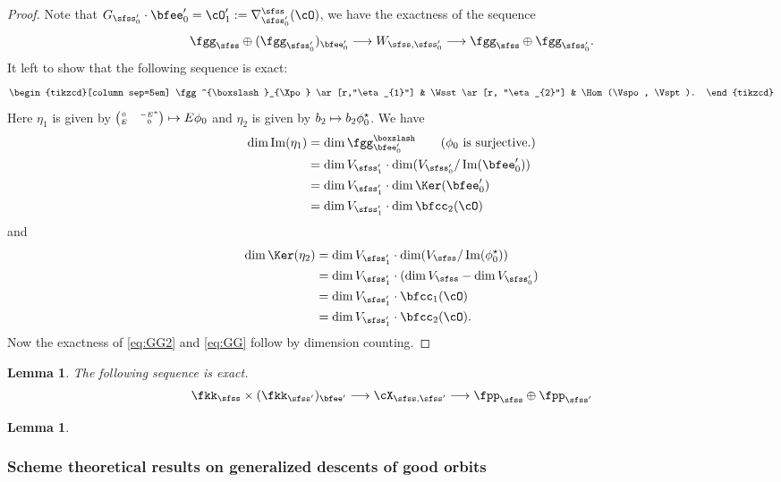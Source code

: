 \documentclass[12pt,a4paper]{amsart}
\def\Im{\operatorname{Im}}
\numberwithin{equation}{section}
\newtheorem{lem}[thm]{Lemma}
\theoremstyle{remark}
\def\mstar{{\star}}
\def\cOp{\cO^{\prime}}
\begin{document}
\begin{proof}
  Note that $\Gspo \cdot \Xpo = \cOp_{1} := \DDsso(\cO)$, we have the exactness of
  the sequence
  \[
    \fggs\oplus (\fggspo)_{\Xpo}\longrightarrow \Wsso \longrightarrow \fggs\oplus \fggspo.
  \]
  It left to show that the following sequence is exact:
  \begin{equation}\label{eq:GG2}
    \begin{tikzcd}[column sep=5em]
      \fgg^{\boxslash}_{\Xpo} \ar[r,"\eta_{1}"] & \Wsst \ar[r, "\eta_{2}"] & \Hom(\Vspo, \Vspt).
    \end{tikzcd}
  \end{equation}
  Here $\eta_{1}$ is given by
  ${\tiny \begin{pmatrix} 0 & -E^*\\ E & 0 \end{pmatrix}}\mapsto E \phi_0$ and
  $\eta_{2}$ is given by $b_2\mapsto b_2 \wwo^\mstar$.
  We have
  \[
    \begin{split}
      \dim \Im(\eta_{1}) &=
      \dim \fgg^{\boxslash}_{\Xpo} \qquad (\text{$\wwo$ is surjective.})\\
      &= \dim\Vspt \cdot \dim (\Vspo/\Im(\Xpo))\\
      &= \dim\Vspt \cdot \dim \Ker(\Xpo)\\
      & = \dim\Vspt \cdot \dim \bfcc_{2}(\cO)
    \end{split}
  \]
  and
  \[
    \begin{split}
      \dim \Ker(\eta_{2}) &= \dim \Vspt \cdot \dim (\Vs / \Im(\wwo^{\mstar})) \\
      &= \dim \Vspt \cdot (\dim \Vs - \dim \Vspo) \\
      &= \dim \Vspt \cdot \bfcc_{1}(\cO)\\
      &= \dim \Vspt \cdot \bfcc_{2}(\cO).
    \end{split}
  \]
  Now the exactness of \eqref{eq:GG2} and \eqref{eq:GG} follow by dimension
  counting.
\end{proof}



\begin{lem}
  The following sequence is exact.
  \[
  \fkks\times (\fkksp)_{\Xp} \longrightarrow \CXss \longrightarrow \fpps \oplus \fppsp
  \]
\end{lem}


\begin{lem}

\end{lem}


\subsubsection{Scheme theoretical results on generalized descents of good orbits}
\end{document}
